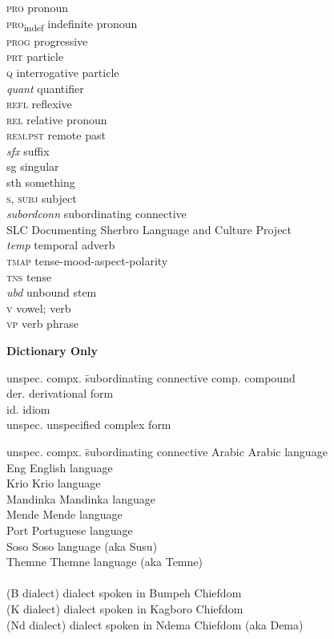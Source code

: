 \begin{tabbing}
\textsc{pro} \> pronoun\\
\textsc{pro}\textsubscript{indef} \> indefinite pronoun\\
\textsc{prog} \> progressive\\
\textsc{prt} \> particle\\
\textsc{q} \> interrogative particle\\
\textit{quant} \>  quantifier\\
\textsc{refl} \> reflexive\\
\textsc{rel} \> relative pronoun\\
\textsc{rem.pst} \> remote past\\
\textit{sfx} \>  suffix\\
sg \> singular\\
sth \> something\\
\textsc{s}, \textsc{subj} \> subject\\
\textit{subordconn} \> subordinating connective\\
SLC \> Documenting Sherbro Language and Culture Project\\
\textit{temp} \>  temporal adverb\\
\textsc{tmap} \> tense-mood-aspect-polarity\\
\textsc{tns} \> tense\\
\textit{ubd} \>  unbound stem\\
\textsc{v} \> vowel; verb\\
\textsc{vp} \> verb phrase\\
\end{tabbing}

\textbf{Dictionary Only}

\begin{tabbing}
unspec. compx.\hspace{1ex} \= subordinating connective\kill
comp. \> compound\\
der. \> derivational form\\
id. \> idiom\\
unspec. \> unspecified complex form
\end{tabbing}

\begin{tabbing}
unspec. compx.\hspace{1ex} \= subordinating connective\kill
Arabic \> Arabic language\\
Eng \> English language\\
Krio \> Krio language\\
Mandinka \> Mandinka language\\
Mende \> Mende language\\
Port \> Portuguese language\\
Soso \> Soso language (aka Susu)\\
Themne \> Themne language (aka Temne)\\ 
\\
(B dialect) \> dialect spoken in Bumpeh Chiefdom\\ 
(K dialect) \> dialect spoken in Kagboro Chiefdom\\
(Nd dialect) \> dialect spoken in Ndema Chiefdom (aka Dema)\\
\end{tabbing}